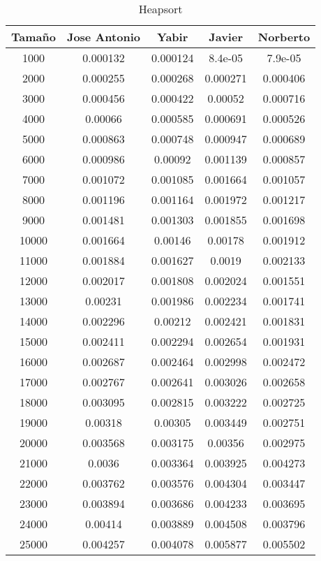 \documentclass{article}
\begin{document}
\newpage

\begin{table}[h]
	\centering
	\caption{Heapsort}
\begin{tabular}{ | c | c  | c | c | c | }
  \hline
   Tama\~no & Jose Antonio & Yabir & Javier & Norberto\\ 
   \hline
1000	&	0.000132	&	0.000124	&	8.4e-05	&	7.9e-05	\\
2000	&	0.000255	&	0.000268	&	0.000271	&	0.000406	\\
3000	&	0.000456	&	0.000422	&	0.00052	&	0.000716	\\
4000	&	0.00066	&	0.000585	&	0.000691	&	0.000526	\\
5000	&	0.000863	&	0.000748	&	0.000947	&	0.000689	\\
6000	&	0.000986	&	0.00092	&	0.001139	&	0.000857	\\
7000	&	0.001072	&	0.001085	&	0.001664	&	0.001057	\\
8000	&	0.001196	&	0.001164	&	0.001972	&	0.001217	\\
9000	&	0.001481	&	0.001303	&	0.001855	&	0.001698	\\
10000	&	0.001664	&	0.00146	&	0.00178	&	0.001912	\\
11000	&	0.001884	&	0.001627	&	0.0019	&	0.002133	\\
12000	&	0.002017	&	0.001808	&	0.002024	&	0.001551	\\
13000	&	0.00231	&	0.001986	&	0.002234	&	0.001741	\\
14000	&	0.002296	&	0.00212	&	0.002421	&	0.001831	\\
15000	&	0.002411	&	0.002294	&	0.002654	&	0.001931	\\
16000	&	0.002687	&	0.002464	&	0.002998	&	0.002472	\\
17000	&	0.002767	&	0.002641	&	0.003026	&	0.002658	\\
18000	&	0.003095	&	0.002815	&	0.003222	&	0.002725	\\
19000	&	0.00318	&	0.00305	&	0.003449	&	0.002751	\\
20000	&	0.003568	&	0.003175	&	0.00356	&	0.002975	\\
21000	&	0.0036	&	0.003364	&	0.003925	&	0.004273	\\
22000	&	0.003762	&	0.003576	&	0.004304	&	0.003447	\\
23000	&	0.003894	&	0.003686	&	0.004233	&	0.003695	\\
24000	&	0.00414	&	0.003889	&	0.004508	&	0.003796	\\
25000	&	0.004257	&	0.004078	&	0.005877	&	0.005502	\\
\hline
\end{tabular}
\end{table}
\end{document}
